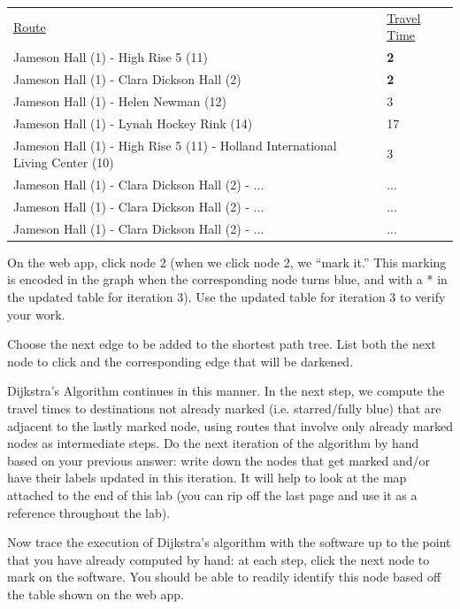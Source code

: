 \documentclass[twoside]{article}%
\begin{document}
\medskip

\begin{tabular}{ll}
\underline{Route}       &\underline{Travel Time}\\
 Jameson Hall (1) - High Rise 5 (11) & {\bf 2} \\
 Jameson Hall (1) - Clara Dickson Hall (2) & {\bf 2} \\
 Jameson Hall (1) -  Helen Newman (12)  &  3\\
 Jameson Hall (1) - Lynah Hockey Rink  (14)   &17 \\
Jameson Hall (1) - High Rise 5 (11) - Holland International Living Center (10)  &3  \\
 Jameson Hall (1) - Clara Dickson Hall (2) - ... & ... \\
 Jameson Hall (1) - Clara Dickson Hall (2) - ... & ... \\
 Jameson Hall (1) - Clara Dickson Hall (2) - ... & ... \\
\end{tabular}


\medskip
\noindent
On the web app, click node 2 (when we click node 2, we ``mark it.''  This marking is encoded in the graph when the corresponding node turns blue, and with a * in the updated table for iteration 3).  Use the updated table for iteration 3 to verify your work.

\medskip
\noindent
Choose the next edge to be added to the
shortest path tree.  List both the next node to click and the corresponding edge that will be darkened.

\vskip 1in


\noindent
Dijkstra's Algorithm continues in this manner. In the next step, we
compute the travel times to destinations not already marked (i.e. starred/fully blue) that
are adjacent to the lastly marked node, using routes that involve only
already marked nodes as intermediate steps.
Do the next iteration of the algorithm by hand based on your previous answer: write down the nodes
that get marked and/or have their labels updated in this iteration.  It will help to look at the map attached to the end of this lab (you can rip off the last page and use it as a reference throughout the lab).

\vskip 2.5in

\noindent

Now trace the execution of Dijkstra's algorithm with the software
up to the point that you have already computed by hand: at each step, click the next node to mark on the software.  You should be able to readily identify this node based off the table shown on the web app.
\end{document}
